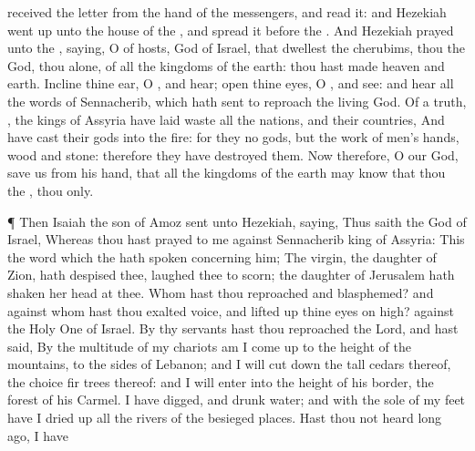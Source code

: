 {received the
letter from the
hand of the
messengers, and
read it: and
Hezekiah went
up unto the
house of the
{}, and
spread it
before the
{}.
And
Hezekiah
prayed unto the
{},
saying,
O
{} of
hosts,
God of
Israel, that
dwellest
{} the
cherubims, thou
{} the
God,
{} thou alone, of all the
kingdoms of the
earth: thou hast
made
heaven and
earth.
Incline thine
ear, O
{}, and
hear;
open thine
eyes, O
{}, and
see: and
hear all the
words of
Sennacherib, which hath
sent to
reproach the
living
God.
Of a
truth,
{}, the
kings of
Assyria have laid
waste all the
nations, and their
countries,
And have
cast their
gods into the
fire: for they
{} no
gods, but the
work of
men’s
hands,
wood and
stone: therefore they have
destroyed them.
Now therefore, O
{} our
God,
save us from his
hand, that all the
kingdoms of the
earth may
know that thou
{} the
{},
{} thou only.
\par }{\PP {}¶ Then
Isaiah the
son of
Amoz
sent unto
Hezekiah,
saying, Thus
saith the
{}
God of
Israel, Whereas thou hast
prayed to me against
Sennacherib
king of
Assyria:
This
{} the
word which the
{} hath
spoken concerning him; The
virgin, the
daughter of
Zion, hath
despised thee,
{} laughed thee to
scorn; the
daughter of
Jerusalem hath
shaken her
head at
thee.
Whom hast thou
reproached and
blasphemed? and against whom hast thou
exalted
{}
voice, and lifted
up thine
eyes on
high?
{} against the Holy
One of
Israel.
By thy
servants hast thou
reproached the
Lord, and hast
said, By the
multitude of my
chariots am I come
up to the
height of the
mountains, to the
sides of
Lebanon; and I will cut
down the
tall
cedars thereof,
{} the
choice fir
trees thereof: and I will
enter into the
height of his
border,
{} the
forest of his
Carmel.
I have
digged, and
drunk
water; and with the
sole of my
feet have I dried
up all the
rivers of the besieged
places.
Hast thou not
heard long
ago,
{} I have
}
